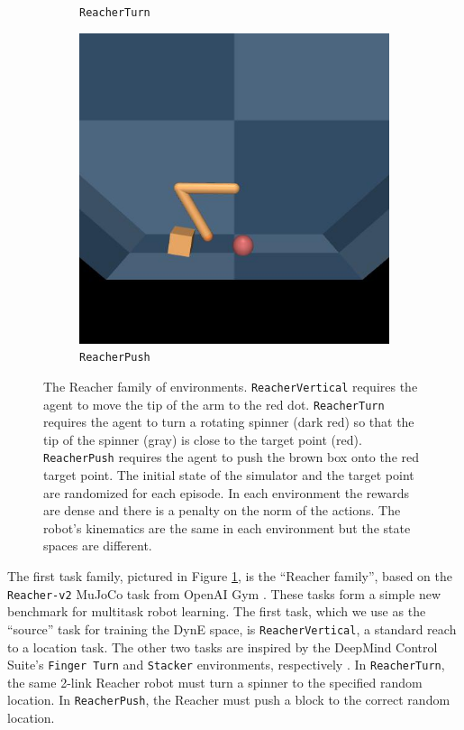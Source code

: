 \begin{subappendices}
\begin{figure}[h]
\begin{subfigure}[t]{0.3\textwidth}
    \caption{\texttt{ReacherTurn}}
\end{subfigure}
\begin{subfigure}[t]{0.3\textwidth}
    \includegraphics[width=\textwidth]{figures/dyne/ReacherPush.jpg}
    \caption{\texttt{ReacherPush}}
\end{subfigure}
\caption{The Reacher family of environments. \texttt{ReacherVertical} requires the agent to move the tip of the arm to the red dot. \texttt{ReacherTurn} requires the agent to turn a rotating spinner (dark red) so that the tip of the spinner (gray) is close to the target point (red). \texttt{ReacherPush} requires the agent to push the brown box onto the red target point. The initial state of the simulator and the target point are randomized for each episode. In each environment the rewards are dense and there is a penalty on the norm of the actions. The robot's kinematics are the same in each environment but the state spaces are different.}
\label{fig:reacher_family}
\end{figure}

The first task family, pictured in Figure \ref{fig:reacher_family}, is the ``Reacher family'', based on the \texttt{Reacher-v2} MuJoCo \citep{todorov2012mujoco} task from OpenAI Gym \citep{brockman2016openai}.
These tasks form a simple new benchmark for multitask robot learning.
The first task, which we use as the ``source'' task for training the DynE space, is \texttt{ReacherVertical}, a standard reach to a location task.
The other two tasks are inspired by the DeepMind Control Suite's \texttt{Finger Turn} and \texttt{Stacker} environments, respectively \citep{tassa2018deepmind}.
In \texttt{ReacherTurn}, the same 2-link Reacher robot must turn a spinner to the specified random location.
In \texttt{ReacherPush}, the Reacher must push a block to the correct random location.


\end{subappendices}
